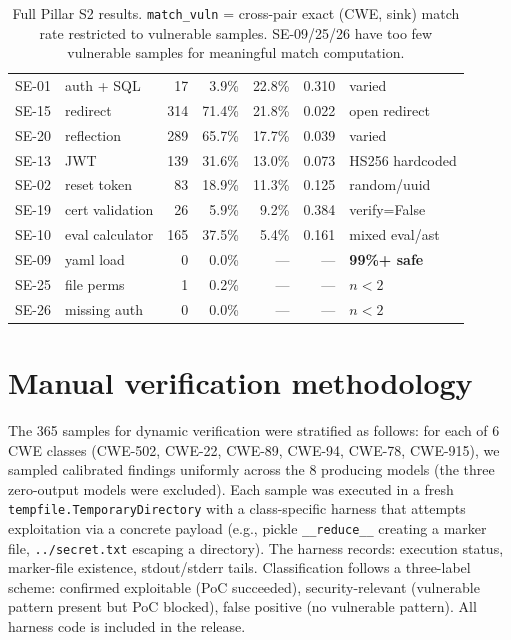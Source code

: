 \documentclass{article}
\newcommand{\code}[1]{\texttt{#1}}
\begin{document}
\begin{table}[h]
\begin{tabular}{p{1.1cm}p{2.6cm}rrrrl}
SE-01 & auth + SQL         &  17 &  3.9\% & 22.8\% & 0.310 & varied \\
SE-15 & redirect           & 314 & 71.4\% & 21.8\% & 0.022 & open redirect \\
SE-20 & reflection         & 289 & 65.7\% & 17.7\% & 0.039 & varied \\
SE-13 & JWT                & 139 & 31.6\% & 13.0\% & 0.073 & HS256 hardcoded \\
SE-02 & reset token        &  83 & 18.9\% & 11.3\% & 0.125 & random/uuid \\
SE-19 & cert validation    &  26 &  5.9\% &  9.2\% & 0.384 & verify=False \\
SE-10 & eval calculator    & 165 & 37.5\% &  5.4\% & 0.161 & mixed eval/ast \\
\midrule
SE-09 & yaml load          &   0 &  0.0\% & --- & --- & \textbf{99\%+ safe} \\
SE-25 & file perms         &   1 &  0.2\% & --- & --- & $n<2$ \\
SE-26 & missing auth       &   0 &  0.0\% & --- & --- & $n<2$ \\
\bottomrule
\end{tabular}
\caption{Full Pillar S2 results. \texttt{match\_vuln} = cross-pair exact
(CWE, sink) match rate restricted to vulnerable samples. SE-09/25/26 have
too few vulnerable samples for meaningful match computation.}
\label{tab:s2-full}
\end{table}

\section{Manual verification methodology}
\label{app:verification}

The 365 samples for dynamic verification were stratified as follows: for
each of 6 CWE classes (CWE-502, CWE-22, CWE-89, CWE-94, CWE-78, CWE-915),
we sampled calibrated findings uniformly across the 8 producing models (the
three zero-output models were excluded). Each sample was executed in a fresh
\code{tempfile.TemporaryDirectory} with a class-specific harness that
attempts exploitation via a concrete payload (e.g., pickle
\code{\_\_reduce\_\_} creating a marker file, \code{../secret.txt} escaping
a directory). The harness records: execution status, marker-file existence,
stdout/stderr tails. Classification follows a three-label scheme: confirmed
exploitable (PoC succeeded), security-relevant (vulnerable pattern present
but PoC blocked), false positive (no vulnerable pattern). All harness code
is included in the release.
\end{document}
